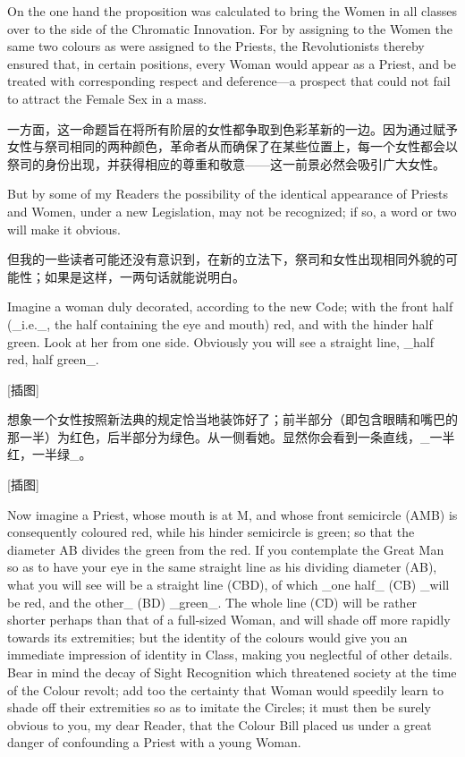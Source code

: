 \documentclass[12pt,UTF8]{ctexbook}
\begin{document}
On the one hand the proposition was calculated to bring the Women in all classes over to the side of the Chromatic Innovation. For by assigning to the Women the same two colours as were assigned to the Priests, the Revolutionists thereby ensured that, in certain positions, every Woman would appear as a Priest, and be treated with corresponding respect and deference---a prospect that could not fail to attract the Female Sex in a mass.

一方面，这一命题旨在将所有阶层的女性都争取到色彩革新的一边。因为通过赋予女性与祭司相同的两种颜色，革命者从而确保了在某些位置上，每一个女性都会以祭司的身份出现，并获得相应的尊重和敬意——这一前景必然会吸引广大女性。

But by some of my Readers the possibility of the identical appearance of Priests and Women, under a new Legislation, may not be recognized; if so, a word or two will make it obvious.

但我的一些读者可能还没有意识到，在新的立法下，祭司和女性出现相同外貌的可能性；如果是这样，一两句话就能说明白。

Imagine a woman duly decorated, according to the new Code; with the front half (\_i.e.\_, the half containing the eye and mouth) red, and with the hinder half green. Look at her from one side. Obviously you will see a straight line, \_half red, half green\_.

[插图]

想象一个女性按照新法典的规定恰当地装饰好了；前半部分（即包含眼睛和嘴巴的那一半）为红色，后半部分为绿色。从一侧看她。显然你会看到一条直线，\_一半红，一半绿\_。

[插图]

Now imagine a Priest, whose mouth is at M, and whose front semicircle (AMB) is consequently coloured red, while his hinder semicircle is green; so that the diameter AB divides the green from the red. If you contemplate the Great Man so as to have your eye in the same straight line as his dividing diameter (AB), what you will see will be a straight line (CBD), of which \_one half\_ (CB) \_will be red, and the other\_ (BD) \_green\_. The whole line (CD) will be rather shorter perhaps than that of a full-sized Woman, and will shade off more rapidly towards its extremities; but the identity of the colours would give you an immediate impression of identity in Class, making you neglectful of other details. Bear in mind the decay of Sight Recognition which threatened society at the time of the Colour revolt; add too the certainty that Woman would speedily learn to shade off their extremities so as to imitate the Circles; it must then be surely obvious to you, my dear Reader, that the Colour Bill placed us under a great danger of confounding a Priest with a young Woman.
\end{document}
